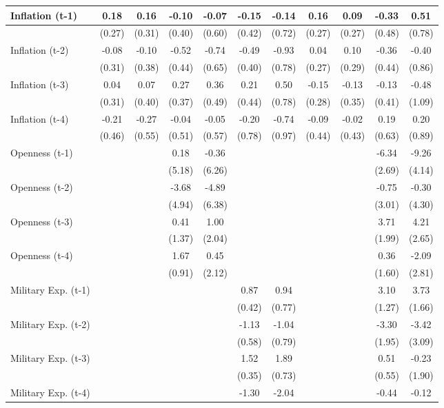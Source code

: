 \begin{tabular}{lcccccccccc}
\toprule
Inflation (t-1) & 0.18 & 0.16 & -0.10 & -0.07 & -0.15 & -0.14 & 0.16 & 0.09 & -0.33 & 0.51 \\
\midrule
& (0.27) & (0.31) & (0.40) & (0.60) & (0.42) & (0.72) & (0.27) & (0.27) & (0.48) & (0.78) \\
Inflation (t-2) & -0.08 & -0.10 & -0.52 & -0.74 & -0.49 & -0.93 & 0.04 & 0.10 & -0.36 & -0.40 \\
& (0.31) & (0.38) & (0.44) & (0.65) & (0.40) & (0.78) & (0.27) & (0.29) & (0.44) & (0.86) \\
Inflation (t-3) & 0.04 & 0.07 & 0.27 & 0.36 & 0.21 & 0.50 & -0.15 & -0.13 & -0.13 & -0.48 \\
& (0.31) & (0.40) & (0.37) & (0.49) & (0.44) & (0.78) & (0.28) & (0.35) & (0.41) & (1.09) \\
Inflation (t-4) & -0.21 & -0.27 & -0.04 & -0.05 & -0.20 & -0.74 & -0.09 & -0.02 & 0.19 & 0.20 \\
& (0.46) & (0.55) & (0.51) & (0.57) & (0.78) & (0.97) & (0.44) & (0.43) & (0.63) & (0.89) \\
Openness (t-1) &  &  & 0.18 & -0.36 &  &  &  &  & -6.34 & -9.26 \\
&  &  & (5.18) & (6.26) &  &  &  &  & (2.69) & (4.14) \\
Openness (t-2) &  &  & -3.68 & -4.89 &  &  &  &  & -0.75 & -0.30 \\
&  &  & (4.94) & (6.38) &  &  &  &  & (3.01) & (4.30) \\
Openness (t-3) &  &  & 0.41 & 1.00 &  &  &  &  & 3.71 & 4.21 \\
&  &  & (1.37) & (2.04) &  &  &  &  & (1.99) & (2.65) \\
Openness (t-4) &  &  & 1.67 & 0.45 &  &  &  &  & 0.36 & -2.09 \\
&  &  & (0.91) & (2.12) &  &  &  &  & (1.60) & (2.81) \\
Military Exp. (t-1) &  &  &  &  & 0.87 & 0.94 &  &  & 3.10 & 3.73 \\
&  &  &  &  & (0.42) & (0.77) &  &  & (1.27) & (1.66) \\
Military Exp. (t-2) &  &  &  &  & -1.13 & -1.04 &  &  & -3.30 & -3.42 \\
&  &  &  &  & (0.58) & (0.79) &  &  & (1.95) & (3.09) \\
Military Exp. (t-3) &  &  &  &  & 1.52 & 1.89 &  &  & 0.51 & -0.23 \\
&  &  &  &  & (0.35) & (0.73) &  &  & (0.55) & (1.90) \\
Military Exp. (t-4) &  &  &  &  & -1.30 & -2.04 &  &  & -0.44 & -0.12 \\

\end{tabular}
